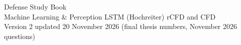 \documentclass[11pt,a4paper]{article}
\begin{document}
\begin{center}
{\LARGE\sffamily\color{qcol} Defense Study Book}\\[5pt]
{\large\sffamily Machine Learning \& Perception \textbullet{} LSTM (Hochreiter) \textbullet{} rCFD and CFD}\\[5pt]
{\small\sffamily Version 2 \textbullet{} updated 20 November 2026 (final thesis numbers, November 2026 questions)}
\end{center}

\tableofcontents
\clearpage














\end{document}
